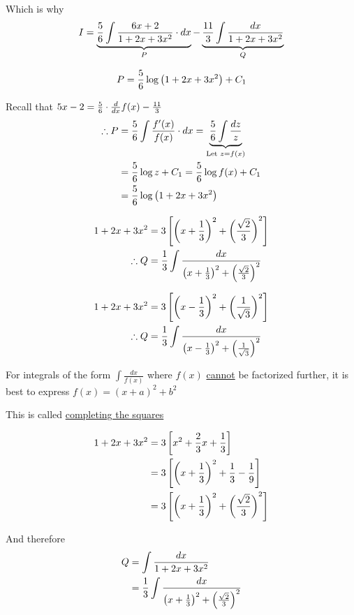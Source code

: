 \documentclass[14pt,fleqn]{extarticle}
\begin{document}
Which is why 
\[ I = \underbrace{\frac{5}{6}\int \frac{6x+2}{1+2x+3x^2}\cdot dx }_P - \underbrace{\frac{11}{3}\int \frac{dx}{1+2x+3x^2}}_Q \]

\newcard 

\[ P = \frac{5}{6}\log \left(1+2x+3x^2 \right) + C_1 \]

\newcard 

Recall that  $5x-2 = \frac{5}{6}\cdot\frac{d}{dx} f(x) -\frac{11}{3}$ 
\begin{align}
	\therefore P &= \frac{5}{6}\int \frac{f'(x)}{f(x)}\cdot dx = \underbrace{\frac{5}{6}\int \frac{dz}{z}}_{\text{Let } z = f(x)} \\
	&= \frac{5}{6}\log z + C_1 = \frac{5}{6}\log f(x) + C_1 \\
	&= \frac{5}{6}\log \left(1+2x+3x^2 \right) 
\end{align}

\newcard 

\begin{align}
	1+2x+3x^2 &= 3 \left[ \left(x + \frac{1}{3} \right)^2  + \left(\frac{\sqrt{2}}{3} \right)^2 \right] \\
	\therefore Q &= \frac{1}{3}\int \frac{dx}{\left(x + \frac{1}{3} \right)^2 + \left(\frac{\sqrt{2}}{3} \right)^2}
\end{align}

\newcard 

\begin{align}
	1+2x+3x^2 &= 3 \left[ \left(x-\frac{1}{3} \right)^2  + \left(\frac{1}{\sqrt{3}} \right)^2 \right] \\
	\therefore Q &= \frac{1}{3}\int \frac{dx}{\left(x-\frac{1}{3} \right)^2  + \left(\frac{1}{\sqrt{3}} \right)^2 }
\end{align}

\newcard 

For integrals of the form $\int \frac{dx}{f(x)}$ where $f(x)$ \underline{cannot} be 
factorized further, it is best to express $f(x) = (x+a)^2 + b^2$ \newline 

This is called \underline{completing the squares}

\begin{align}
	1+2x+3x^2 &= 3 \left[x^2 + \frac{2}{3}x + \frac{1}{3} \right] \\
	&= 3 \left[\left(x + \frac{1}{3} \right)^2 + \frac{1}{3} - \frac{1}{9} \right] \\
	&= 3 \left[\left(x + \frac{1}{3} \right)^2 + \left(\frac{\sqrt{2}}{3} \right)^2 \right]
\end{align}

And therefore 
\begin{align}
	Q &= \int \frac{dx}{1+2x+3x^2} \\
	&= \frac{1}{3}\int \frac{dx}{\left(x + \frac{1}{3} \right)^2 + \left(\frac{\sqrt{2}}{3} \right)^2}
\end{align}
\end{document}
